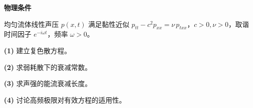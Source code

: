 \textbf{物理条件}\par 均匀流体线性声压 \(p(x,t)\) 满足黏性近似 \(p_{tt}-c^2p_{xx}=\nu\,p_{txx}\)，\(c>0,\nu>0\)，取谐时间因子 \(e^{-i\omega t}\)，频率 \(\omega>0\)。
\par\noindent\textbf{(1)} 建立复色散方程。
\par\noindent\textbf{(2)} 求弱耗散下的衰减常数。
\par\noindent\textbf{(3)} 求声强的能流衰减长度。
\par\noindent\textbf{(4)} 讨论高频极限对有效方程的适用性。
